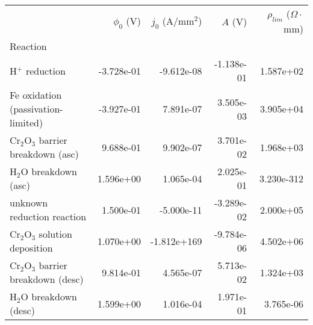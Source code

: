 \begin{tabular}{lrrrr}
\toprule
{} &  $\phi_0$ (V) &  $j_0$ (A/mm$^2$) &    $A$ (V) &  $\rho_{lim}$ ($\Omega \cdot$mm) \\
Reaction                             &               &                   &            &                                  \\
\midrule
H$^+$ reduction                      &    -3.728e-01 &        -9.612e-08 & -1.138e-01 &                        1.587e+02 \\
Fe oxidation (passivation-limited)   &    -3.927e-01 &         7.891e-07 &  3.505e-03 &                        3.905e+04 \\
Cr$_2$O$_3$ barrier breakdown (asc)  &     9.688e-01 &         9.902e-07 &  3.701e-02 &                        1.968e+03 \\
H$_2$O breakdown (asc)               &     1.596e+00 &         1.065e-04 &  2.025e-01 &                       3.230e-312 \\
unknown reduction reaction           &     1.500e-01 &        -5.000e-11 & -3.289e-02 &                        2.000e+05 \\
Cr$_2$O$_3$ solution deposition      &     1.070e+00 &       -1.812e+169 & -9.784e-06 &                        4.502e+06 \\
Cr$_2$O$_3$ barrier breakdown (desc) &     9.814e-01 &         4.565e-07 &  5.713e-02 &                        1.324e+03 \\
H$_2$O breakdown (desc)              &     1.599e+00 &         1.016e-04 &  1.971e-01 &                        3.765e-06 \\
\bottomrule
\end{tabular}
